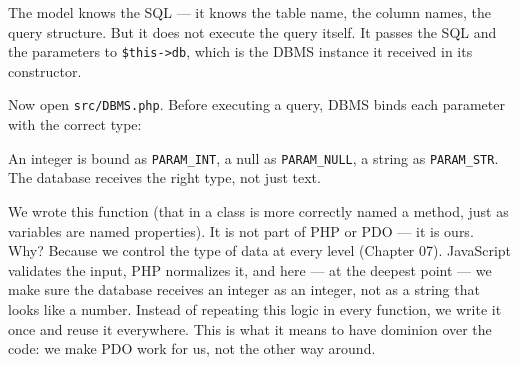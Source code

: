 \documentclass[11pt,a4paper,oneside]{book}
\newenvironment{Shaded}{\begin{snugshade}}{\end{snugshade}}
\newcommand{\KeywordTok}[1]{\textcolor[HTML]{007020}{\textbf{#1}}}
\newcommand{\DataTypeTok}[1]{\textcolor[HTML]{902000}{#1}}
\newcommand{\ConstantTok}[1]{\textcolor[HTML]{880000}{#1}}
\newcommand{\OtherTok}[1]{\textcolor[HTML]{007020}{#1}}
\newcommand{\FunctionTok}[1]{\textcolor[HTML]{06287E}{#1}}
\newcommand{\VariableTok}[1]{\textcolor[HTML]{19177C}{#1}}
\newcommand{\ControlFlowTok}[1]{\textcolor[HTML]{007020}{\textbf{#1}}}
\newcommand{\OperatorTok}[1]{\textcolor[HTML]{666666}{#1}}
\newcommand{\BuiltInTok}[1]{#1}
\newcommand{\NormalTok}[1]{#1}
\begin{document}
The model knows the SQL --- it knows the table name, the column
names, the query structure. But it does not execute the query
itself. It passes the SQL and the parameters to
\texttt{\$this-\textgreater{}db}, which is the DBMS instance it
received in its constructor.

Now open \texttt{src/DBMS.php}. Before executing a query, DBMS
binds each parameter with the correct type:

\begin{Shaded}
\end{Shaded}

An integer is bound as \texttt{PARAM\_INT}, a null as
\texttt{PARAM\_NULL}, a string as \texttt{PARAM\_STR}. The
database receives the right type, not just text.

We wrote this function (that in a class is more correctly named a
method, just as variables are named properties). It is not part
of PHP or PDO --- it is ours. Why? Because we control the type of
data at every level (Chapter 07). JavaScript validates the input,
PHP normalizes it, and here --- at the deepest point --- we make
sure the database receives an integer as an integer, not as a
string that looks like a number. Instead of repeating this logic
in every function, we write it once and reuse it everywhere. This
is what it means to have dominion over the code: we make PDO work
for us, not the other way around.
\end{document}
